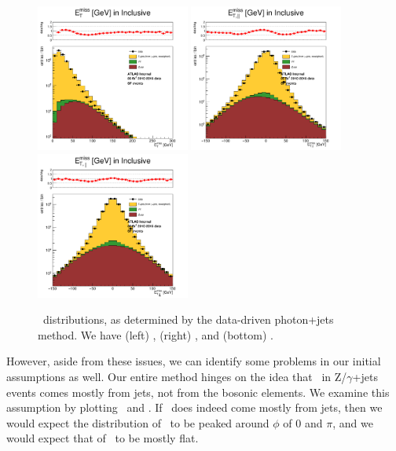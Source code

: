 \begin{figure}[hbtp]
    \centering
    \includegraphics[width=0.45\textwidth]{Images/SUSY/photon_method_MET.pdf}
    \includegraphics[width=0.45\textwidth]{Images/SUSY/photon_method_METl.pdf}
    \includegraphics[width=0.45\textwidth]{Images/SUSY/photon_method_METt.pdf}
    \caption{\MET\ distributions, as determined by the data-driven photon+jets method. We have (left) \MET, (right) \METl, and (bottom) \METt.}
    \label{fig:photon_method_MET}
\end{figure}

However, aside from these issues, we can identify some problems in our initial assumptions as well. Our entire method hinges on the idea that \MET\ in Z/$\gamma$+jets events comes mostly from jets, not from the bosonic elements. We examine this assumption by plotting \mindphijm\ and \dphiptllmet. If \MET\ does indeed come mostly from jets, then we would expect the distribution of \mindphijm\ to be peaked around $\phi$ of 0 and $\pi$, and we would expect that of \dphiptllmet\ to be mostly flat.

